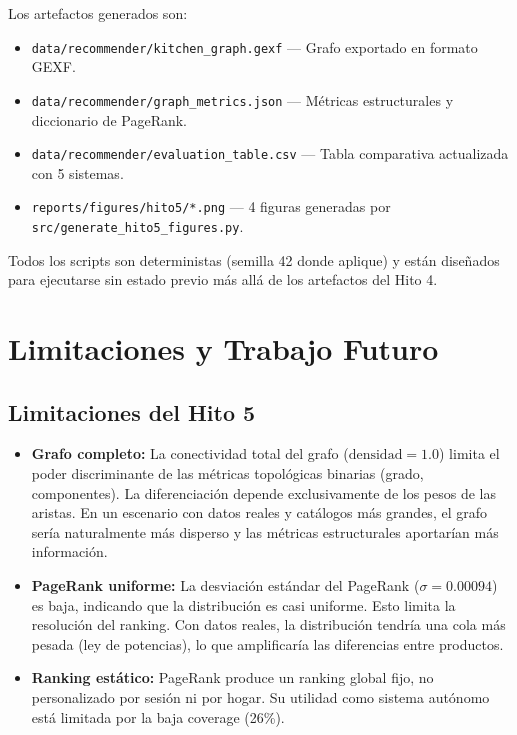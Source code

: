 \documentclass[12pt,a4paper]{article}
\newcommand{\code}[1]{\texttt{\small #1}}
\begin{document}
Los artefactos generados son:

\begin{itemize}
    \item \code{data/recommender/kitchen\_graph.gexf} — Grafo exportado en formato GEXF.
    \item \code{data/recommender/graph\_metrics.json} — Métricas estructurales y diccionario de PageRank.
    \item \code{data/recommender/evaluation\_table.csv} — Tabla comparativa actualizada con 5 sistemas.
    \item \code{reports/figures/hito5/*.png} — 4 figuras generadas por \code{src/generate\_hito5\_figures.py}.
\end{itemize}

Todos los scripts son deterministas (semilla 42 donde aplique) y están diseñados para ejecutarse sin estado previo más allá de los artefactos del Hito 4.

\section{Limitaciones y Trabajo Futuro}

\subsection{Limitaciones del Hito 5}

\begin{itemize}
    \item \textbf{Grafo completo:} La conectividad total del grafo ($\text{densidad} = 1.0$) limita el poder discriminante de las métricas topológicas binarias (grado, componentes). La diferenciación depende exclusivamente de los pesos de las aristas. En un escenario con datos reales y catálogos más grandes, el grafo sería naturalmente más disperso y las métricas estructurales aportarían más información.

    \item \textbf{PageRank uniforme:} La desviación estándar del PageRank ($\sigma = 0.00094$) es baja, indicando que la distribución es casi uniforme. Esto limita la resolución del ranking. Con datos reales, la distribución tendría una cola más pesada (ley de potencias), lo que amplificaría las diferencias entre productos.

    \item \textbf{Ranking estático:} PageRank produce un ranking global fijo, no personalizado por sesión ni por hogar. Su utilidad como sistema autónomo está limitada por la baja coverage (26\%).
\end{itemize}
\end{document}
